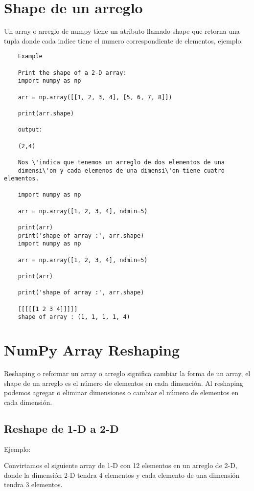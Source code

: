 \section{Shape de un arreglo}
Un array o arreglo de numpy tiene un atributo llamado shape que retorna una tupla donde cada indice tiene el numero correspondiente de elementos, ejemplo: 
\begin{verbatim}
	Example
	
	Print the shape of a 2-D array:
	import numpy as np
	
	arr = np.array([[1, 2, 3, 4], [5, 6, 7, 8]])
	
	print(arr.shape) 
	
	output: 
	
	(2,4)
	
	Nos \'indica que tenemos un arreglo de dos elementos de una
	dimensi\'on y cada elemenos de una dimensi\'on tiene cuatro elementos.
	
	import numpy as np
	
	arr = np.array([1, 2, 3, 4], ndmin=5)
	
	print(arr)
	print('shape of array :', arr.shape) 
	import numpy as np
	
	arr = np.array([1, 2, 3, 4], ndmin=5)
	
	print(arr)
	
	print('shape of array :', arr.shape)
	
	[[[[[1 2 3 4]]]]]
	shape of array : (1, 1, 1, 1, 4)
\end{verbatim}

\section{NumPy Array Reshaping}

Reshaping o reformar un array o arreglo significa cambiar la forma de un array, el shape de un arreglo es el n\'umero de elementos en cada dimenci\'on. Al reshaping podemos agregar o eliminar dimensiones o cambiar el n\'umero de elementos en cada dimensi\'on. 

\subsection{Reshape de 1-D a 2-D}

Ejemplo: 

Convirtamos el siguiente array de  1-D con 12 elementos en un arreglo de 2-D, donde la dimensi\'on 2-D tendra 4 elementos y cada elemento de una dimensi\'on tendra 3 elementos.

